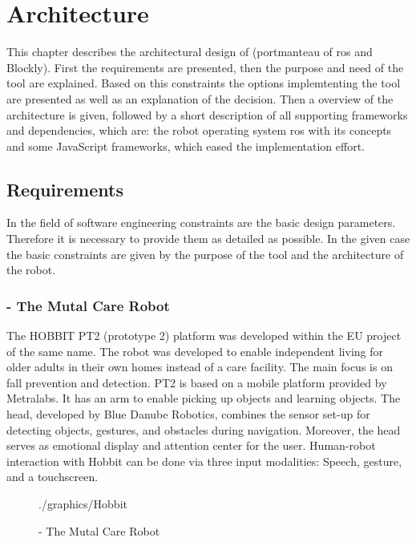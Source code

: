 \chapter{Architecture}
This chapter describes the architectural design of \toolname{} (portmanteau of \gls{ros} and Blockly). First the requirements are presented, then the purpose and need of the tool are explained. Based on this constraints the options implemtenting the tool are presented as well as an explanation of the decision. Then a overview of the architecture is given, followed by a short description of all supporting frameworks and dependencies, which are: the robot operating system \gls{ros} with its concepts and some JavaScript frameworks, which eased the implementation effort.

\section{Requirements} \label{sec:requirements}
In the field of software engineering constraints are the basic design parameters. Therefore it is necessary to provide them as detailed as possible. In the given case the basic constraints are given by the purpose of the tool and the architecture of the robot.

\subsection{\hobbit{} - The Mutal Care Robot}
The HOBBIT PT2 (prototype 2) platform was developed within the EU project of the same name. The robot was developed to enable independent living for older adults in their own homes instead of a care facility. The main focus is on fall prevention and detection. PT2 is based on a mobile platform provided by Metralabs. It has an arm to enable picking up objects and learning objects. The head, developed by Blue Danube Robotics, combines the sensor set-up for detecting objects, gestures, and obstacles during navigation. Moreover, the head serves as emotional display and attention center for the user. Human-robot interaction with Hobbit can be done via three input modalities: Speech, gesture, and a touchscreen. \cite{HobbitACIN}\\

\begin{figure}[htbp]
	\centering
	\begin{overpic}[width=0.3\linewidth]{./graphics/Hobbit}
	\end{overpic}
	\caption{\hobbit{} - The Mutal Care Robot}%
	\label{fig:HobbitPic}%
\end{figure}

